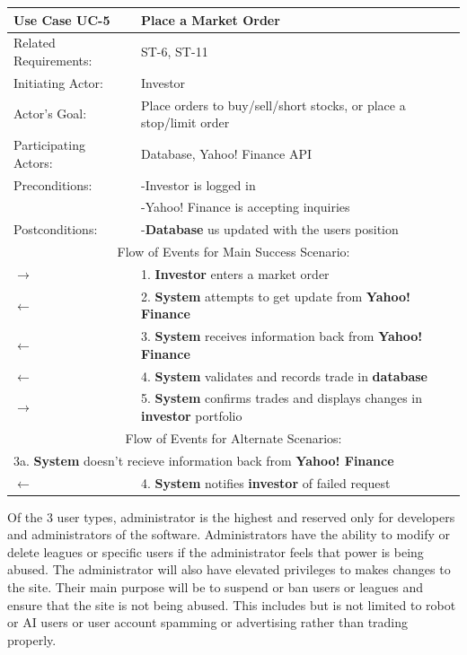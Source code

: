 \begin{centering}
\label{UC-5}
\renewcommand\arraystretch{1.3}
\begin{longtable}{|p{1.2in} p{5in}|}
\hline
\bfseries{\color{color1}Use Case UC-5} &
\bfseries{\color{color1}Place a Market Order} \\
\hline
Related Requirements: & ST-6, ST-11 \\
Initiating Actor:     & Investor \\
Actor's Goal:         & Place orders to buy/sell/short stocks, or place a stop/limit order \\
Participating Actors: & Database, Yahoo! Finance API \\
Preconditions:        & -Investor is logged in \\
                      & -Yahoo! Finance is accepting inquiries \\
Postconditions:       & -\textbf{Database} us updated with the users position \\
\hline
\multicolumn{2}{|c|}{\color{color1}Flow of Events for Main Success Scenario:}\\
\hline

$\rightarrow$ & 1. \textbf{Investor} enters a market order \\
$\leftarrow$ & 2. \textbf{System} attempts to get update from \textbf{Yahoo! Finance} \\
$\leftarrow$ & 3. \textbf{System} receives information back from \textbf{Yahoo! Finance} \\
$\leftarrow$ & 4. \textbf{System} validates and records trade in \textbf{database} \\
$\rightarrow$ & 5. \textbf{System} confirms trades and displays changes in \textbf{investor}
portfolio\\
\hline

\multicolumn{2}{|c|}{\color{color1}Flow of Events for Alternate Scenarios:} \\
\hline

\multicolumn{2}{|p{6.2in}|}{3a. \textbf{System} doesn't recieve information back from
\textbf{Yahoo! Finance}} \\
\hline

$\leftarrow$ & 4. \textbf{System} notifies \textbf{investor} of failed request \\
\hline

\end{longtable}
\end{centering}

Of the 3 user types, administrator is the highest and reserved only for developers and
administrators of the software. Administrators have the ability to modify or delete leagues
or specific users if the administrator feels that power is being abused. The administrator
will also have elevated privileges to makes changes to the site. Their main purpose will be to
suspend or ban users or leagues and ensure that the site is not being abused. This includes but
is not limited to robot or AI users or user account spamming or advertising rather than trading
properly. \\

